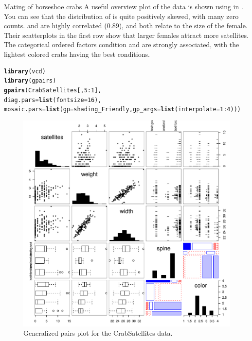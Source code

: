 \documentclass[11pt]{book}\usepackage[]{graphicx}\usepackage[]{color}
\makeatletter
\newcommand{\hlnum}[1]{\textcolor[rgb]{0.686,0.059,0.569}{#1}}%
\newcommand{\hlopt}[1]{\textcolor[rgb]{0,0,0}{#1}}%
\newcommand{\hlstd}[1]{\textcolor[rgb]{0.345,0.345,0.345}{#1}}%
\newcommand{\hlkwc}[1]{\textcolor[rgb]{0.333,0.667,0.333}{#1}}%
\newcommand{\hlkwd}[1]{\textcolor[rgb]{0.737,0.353,0.396}{\textbf{#1}}}%
\newenvironment{kframe}{%
 \def\at@end@of@kframe{}%
 \ifinner\ifhmode%
  \def\at@end@of@kframe{\end{minipage}}%
  \begin{minipage}{\columnwidth}%
 \fi\fi%
 \def\FrameCommand##1{\hskip\@totalleftmargin \hskip-\fboxsep
 \colorbox{shadecolor}{##1}\hskip-\fboxsep
     \hskip-\linewidth \hskip-\@totalleftmargin \hskip\columnwidth}%
 \MakeFramed {\advance\hsize-\width
   \@totalleftmargin\z@ \linewidth\hsize
   \@setminipage}}%
 {\par\unskip\endMakeFramed%
 \at@end@of@kframe}
\newenvironment{knitrout}{}{} %
\renewenvironment{knitrout}{\small\renewcommand{\baselinestretch}{.85}}{} %
\makeatother
\begin{document}
\begin{Example}[crabs1]{Mating of horseshoe crabs}
A useful overview plot of the data is shown using  in .
You can see that the distribution of  is quite positively skewed,
with many zero counts.   and  are highly correlated (0.89),
and both relate to the size of the female.
Their scatterplots in the first row show that larger females attract more satellites.
The categorical ordered factors  condition and  are strongly
associated, with the lightest colored crabs having the best conditions.
\begin{knitrout}
\color{fgcolor}\begin{kframe}
\begin{alltt}
\hlkwd{library}\hlstd{(vcd)}
\hlkwd{library}\hlstd{(gpairs)}
\hlkwd{gpairs}\hlstd{(CrabSatellites[,}\hlnum{5}\hlopt{:}\hlnum{1}\hlstd{],}
       \hlkwc{diag.pars} \hlstd{=} \hlkwd{list}\hlstd{(}\hlkwc{fontsize}\hlstd{=}\hlnum{16}\hlstd{),}
       \hlkwc{mosaic.pars} \hlstd{=} \hlkwd{list}\hlstd{(}\hlkwc{gp}\hlstd{=shading_Friendly,} \hlkwc{gp_args}\hlstd{=}\hlkwd{list}\hlstd{(}\hlkwc{interpolate}\hlstd{=}\hlnum{1}\hlopt{:}\hlnum{4}\hlstd{)))}
\end{alltt}
\end{kframe}\begin{figure}[!htbp]

\centerline{\includegraphics[width=.8\textwidth]{ch09/fig/crabs1-gpairs-1} }

\caption[Generalized pairs plot for the CrabSatellites data]{Generalized pairs plot for the CrabSatellites data.\label{fig:crabs1-gpairs}}
\end{figure}



\end{knitrout}
\end{Example}
\end{document}
